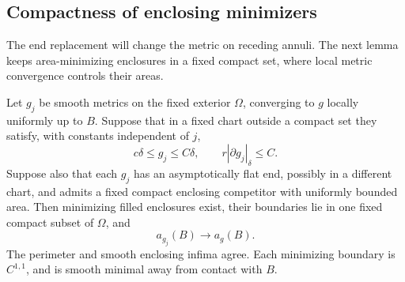 \subsection{Compactness of enclosing minimizers}

The end replacement will change the metric on receding annuli.  The next
lemma keeps area-minimizing enclosures in a fixed compact set, where local
metric convergence controls their areas.

\begin{lemma}
\label{n3:reduction:area-compactness}
Let $g_j$ be smooth metrics on the fixed exterior $\Omega$, converging to $g$
locally uniformly up to $B$.  Suppose that in a fixed chart outside a
compact set they satisfy, with constants independent of $j$,
\begin{equation}
 \label{n3:reduction:area-geometry}
 c\delta\le g_j\le C\delta,\qquad r|\partial g_j|_\delta\le C.
\end{equation}
Suppose also that each $g_j$ has an asymptotically flat end, possibly
in a different chart, and admits a fixed compact enclosing competitor
with uniformly bounded area.  Then minimizing filled enclosures exist,
their boundaries lie in one fixed compact subset of $\Omega$, and
\[
 a_{g_j}(B)\longrightarrow a_g(B).
\]
The perimeter and smooth enclosing infima agree.  Each minimizing
boundary is $C^{1,1}$, and is smooth minimal away from contact with $B$.
\end{lemma}

